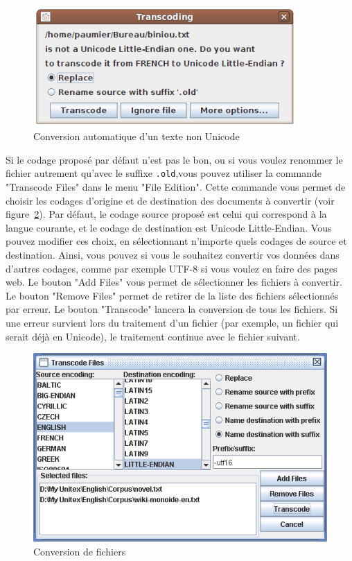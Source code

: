 \begin{figure}[!h]
\begin{center}
\includegraphics[width=10cm]{resources/img/fig2-2.png}
\caption{\label{auto-transcoding}Conversion automatique d’un texte non Unicode}
\end{center}
\end{figure}

\bigskip
\noindent Si le codage proposé par défaut n’est pas le bon, ou si vous voulez renommer le fichier
autrement qu’avec le suffixe \verb$.old$,vous pouvez utiliser la commande "Transcode Files"
dans le menu "File Edition". Cette commande vous permet de choisir les codages d’origine
et de destination des documents à convertir (voir figure~\ref{transcoding}). Par défaut, le codage
source proposé est celui qui correspond à la langue courante, et le codage de destination est
Unicode Little-Endian. Vous pouvez modifier ces choix, en sélectionnant n’importe quels
codages de source et destination. Ainsi, vous pouvez si vous le souhaitez convertir vos données
dans d’autres codages, comme par exemple UTF-8 si vous voulez en faire des pages
web. Le bouton "Add Files" vous permet de sélectionner les fichiers à convertir. Le bouton
"Remove Files" permet de retirer de la liste des fichiers sélectionnés par erreur. Le bouton
"Transcode" lancera la conversion de tous les fichiers. Si une erreur survient lors du traitement
d’un fichier (par exemple, un fichier qui serait déjà en Unicode), le traitement continue
avec le fichier suivant.


\begin{figure}[!h]
\begin{center}
\includegraphics[width=12cm]{resources/img/fig2-3.png}
\caption{\label{transcoding}Conversion de fichiers}
\end{center}
\end{figure}

